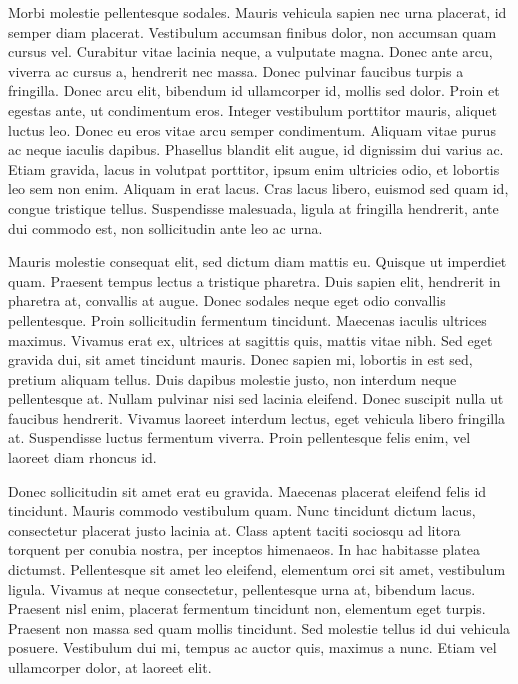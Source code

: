 Morbi molestie pellentesque sodales. Mauris vehicula sapien nec urna placerat, id semper diam placerat. Vestibulum accumsan finibus dolor, non accumsan quam cursus vel. Curabitur vitae lacinia neque, a vulputate magna. Donec ante arcu, viverra ac cursus a, hendrerit nec massa. Donec pulvinar faucibus turpis a fringilla. Donec arcu elit, bibendum id ullamcorper id, mollis sed dolor. Proin et egestas ante, ut condimentum eros. Integer vestibulum porttitor mauris, aliquet luctus leo. Donec eu eros vitae arcu semper condimentum. Aliquam vitae purus ac neque iaculis dapibus. Phasellus blandit elit augue, id dignissim dui varius ac. Etiam gravida, lacus in volutpat porttitor, ipsum enim ultricies odio, et lobortis leo sem non enim. Aliquam in erat lacus. Cras lacus libero, euismod sed quam id, congue tristique tellus. Suspendisse malesuada, ligula at fringilla hendrerit, ante dui commodo est, non sollicitudin ante leo ac urna.

Mauris molestie consequat elit, sed dictum diam mattis eu. Quisque ut imperdiet quam. Praesent tempus lectus a tristique pharetra. Duis sapien elit, hendrerit in pharetra at, convallis at augue. Donec sodales neque eget odio convallis pellentesque. Proin sollicitudin fermentum tincidunt. Maecenas iaculis ultrices maximus. Vivamus erat ex, ultrices at sagittis quis, mattis vitae nibh. Sed eget gravida dui, sit amet tincidunt mauris. Donec sapien mi, lobortis in est sed, pretium aliquam tellus. Duis dapibus molestie justo, non interdum neque pellentesque at. Nullam pulvinar nisi sed lacinia eleifend. Donec suscipit nulla ut faucibus hendrerit. Vivamus laoreet interdum lectus, eget vehicula libero fringilla at. Suspendisse luctus fermentum viverra. Proin pellentesque felis enim, vel laoreet diam rhoncus id.

Donec sollicitudin sit amet erat eu gravida. Maecenas placerat eleifend felis id tincidunt. Mauris commodo vestibulum quam. Nunc tincidunt dictum lacus, consectetur placerat justo lacinia at. Class aptent taciti sociosqu ad litora torquent per conubia nostra, per inceptos himenaeos. In hac habitasse platea dictumst. Pellentesque sit amet leo eleifend, elementum orci sit amet, vestibulum ligula. Vivamus at neque consectetur, pellentesque urna at, bibendum lacus. Praesent nisl enim, placerat fermentum tincidunt non, elementum eget turpis. Praesent non massa sed quam mollis tincidunt. Sed molestie tellus id dui vehicula posuere. Vestibulum dui mi, tempus ac auctor quis, maximus a nunc. Etiam vel ullamcorper dolor, at laoreet elit.

